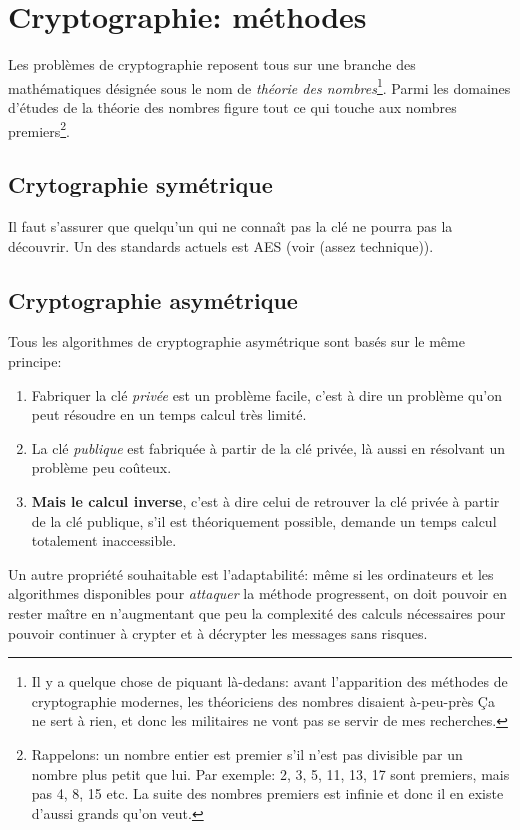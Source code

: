 \section{Cryptographie: méthodes}
Les problèmes de cryptographie reposent tous sur une branche des
mathématiques désignée sous le nom de \emph{théorie des
  nombres}\footnote{Il y a quelque chose de piquant là-dedans: avant
  l'apparition des méthodes de cryptographie modernes, les théoriciens
  des nombres disaient  à-peu-près \og Ça ne sert à rien, et donc les
  militaires ne vont pas se servir de mes recherches\fg.}. Parmi les
domaines d'études de la théorie des nombres figure tout ce qui touche
aux nombres premiers\footnote{Rappelons: un nombre entier est premier
  s'il n'est pas divisible par un nombre plus petit que lui. Par
  exemple: 2, 3, 5, 11, 13, 17 sont premiers, mais pas 4, 8, 15
  etc. La suite des nombres premiers est infinie et donc il en existe
  d'aussi grands qu'on veut.}.


\subsection{Crytographie symétrique}
Il faut s'assurer que quelqu'un qui ne connaît pas la clé ne pourra
pas la découvrir. Un des standards actuels est AES (voir \cite{aes}
(assez technique)).
\subsection{Cryptographie asymétrique}
Tous les algorithmes de cryptographie asymétrique sont basés sur le
même principe:
\begin{enumerate}
  \item Fabriquer la clé \emph{privée} est un problème facile, c'est à dire
    un problème qu'on peut résoudre en un temps calcul très limité.
  \item La clé \emph{publique} est fabriquée à partir de la clé privée, là
    aussi en résolvant un problème peu coûteux.
  \item \textbf{Mais le calcul inverse}, c'est à dire celui de
    retrouver la clé privée à 
    partir de la clé publique, 
    s'il est théoriquement possible, demande un temps calcul
    totalement inaccessible.
\end{enumerate}
Un autre propriété souhaitable est l'adaptabilité: même si les
ordinateurs et les algorithmes disponibles pour \emph{attaquer} la méthode
progressent, on doit pouvoir en rester maître en n'augmentant que peu la
complexité des calculs nécessaires pour pouvoir continuer à crypter et à
décrypter les messages sans risques.

